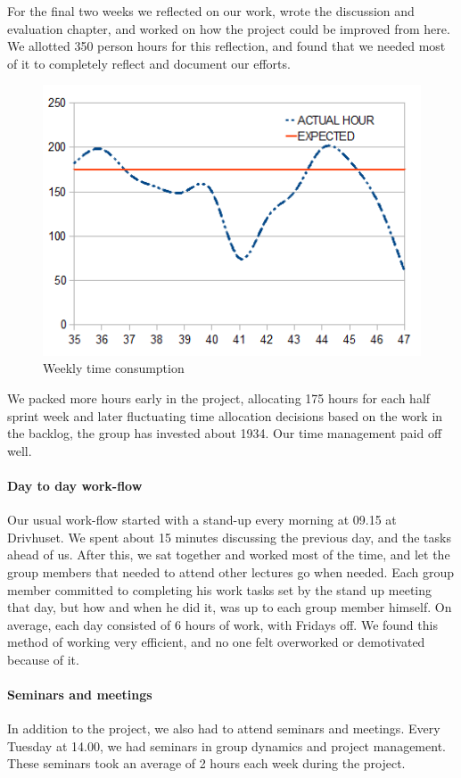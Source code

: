   For the final two weeks we reflected on our work, wrote the discussion and
  evaluation chapter, and worked on how the project could be improved from here.
  We allotted 350 person hours for this reflection, and found that we needed most
  of it to completely reflect and document our efforts.
  \begin{figure}[htb]
        \centering
        \includegraphics[scale=0.88]{timegraph.png}
        \caption{Weekly time consumption}
        \label{fig:time}
    \end{figure}
      We packed more hours early in the project, allocating 175 hours for each half sprint week and later fluctuating time allocation decisions based on the work in the backlog, the group has invested about 1934. Our time management paid off well. 

  \paragraph{Day to day work-flow}
  Our usual work-flow started with a stand-up every morning at 09.15 at Drivhuset.
  We spent about 15 minutes discussing the previous day, and the tasks ahead of
  us. After this, we sat together and worked most of the time, and let the group
  members that needed to attend other lectures go when needed. Each group member
  committed to completing his work tasks set by the stand up meeting that day,
  but how and when he did it, was up to each group member himself. On average,
  each day consisted of 6 hours of work, with Fridays off. We found this method
  of working very efficient, and no one felt overworked or demotivated because
  of it.

  \paragraph{Seminars and meetings}
  In addition to the project, we also had to attend seminars and meetings. Every
  Tuesday at 14.00, we had seminars in group dynamics and project management.
  These seminars took an average of 2 hours each week during the project.

